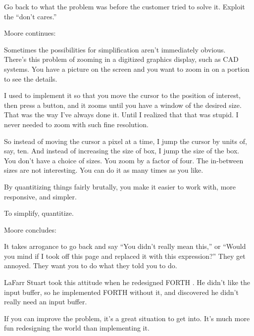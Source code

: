\begin{tip}
Go back to what the problem was before the customer tried to solve it.
Exploit the ``don't cares.''
\end{tip}




\begin{interview}
Moore continues:

\begin{tfquot}
Sometimes the possibilities for simplification aren't immediately
obvious.\\
There's this problem of zooming in a digitized graphics display, such
as CAD systems. You have a picture on the screen and you want to zoom
in on a portion to see the details.

I used to implement it so that you move the cursor to the position of
interest, then press a button, and it zooms until you have a window of
the desired size. That was the way I've always done it. Until I
realized that that was stupid. I never needed to zoom with such fine
resolution.

So instead of moving the cursor a pixel at a time, I jump the cursor
by units of, say, ten. And instead of increasing the size of box, I
jump the size of the box. You don't have a choice of sizes. You zoom
by a factor of four. The in-between sizes are not interesting. You can
do it as many times as you like.

By quantitizing things fairly brutally, you make it easier to work with,
more responsive, and simpler.
\end{tfquot}
\end{interview}

\begin{tip}
To simplify, quantitize.
\end{tip}

\begin{interview}
Moore concludes:
\begin{tfquot}
It takes arrogance to go back and say ``You didn't really mean this,''
or ``Would you mind if I took off this page and replaced it with this
expression?'' They get annoyed. They want you to do what they told you
to do.

LaFarr Stuart took this attitude when he redesigned FORTH \cite{stuart80}. He
didn't like the input buffer, so he implemented FORTH without it, and
discovered he didn't really need an input buffer.

If you can improve the problem, it's a great situation to get into.
It's much more fun redesigning the world than implementing it.
\end{tfquot}
\end{interview}

